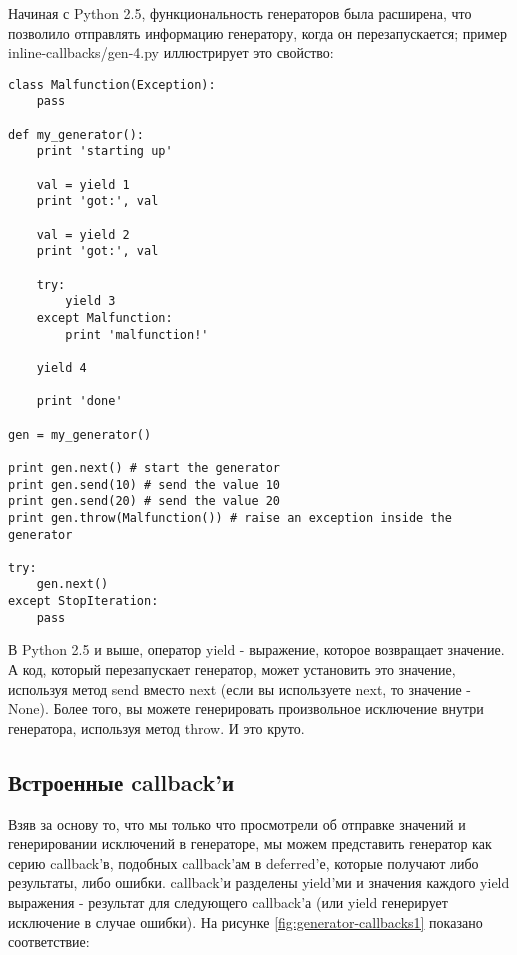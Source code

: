 Начиная с Python 2.5, функциональность генераторов была 
расширена, что позволило отправлять информацию 
генератору, когда он перезапускается; пример 
inline-callbacks/gen-4.py иллюстрирует это свойство:


 \begin{verbatim}
class Malfunction(Exception):
    pass

def my_generator():
    print 'starting up'

    val = yield 1
    print 'got:', val

    val = yield 2
    print 'got:', val

    try:
        yield 3
    except Malfunction:
        print 'malfunction!'

    yield 4

    print 'done'

gen = my_generator()

print gen.next() # start the generator
print gen.send(10) # send the value 10
print gen.send(20) # send the value 20
print gen.throw(Malfunction()) # raise an exception inside the generator

try:
    gen.next()
except StopIteration:
    pass
\end{verbatim} 


В Python 2.5 и выше, оператор yield - выражение, 
которое возвращает значение. А код, который перезапускает генератор, 
может установить это значение, используя метод send вместо next (если 
вы используете next, то значение - None). Более того, 
вы можете генерировать произвольное 
исключение внутри генератора, используя метод throw. И это круто.


\subsection{Встроенные callback'и}


Взяв за основу то, что мы только что просмотрели об отправке значений и 
генерировании исключений в генераторе, мы можем представить генератор 
как серию callback'в, подобных callback'ам в deferred'е, которые 
получают либо результаты, либо ошибки. callback'и разделены 
yield'ми и значения каждого yield выражения - результат для следующего 
callback'а (или yield генерирует исключение в случае ошибки). 
На рисунке \ref{fig:generator-callbacks1} показано соответствие:
 
